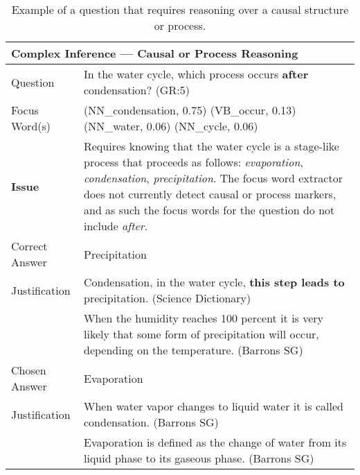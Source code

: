  
\begin{table}[]
\begin{footnotesize}
\begin{tabularx}{\textwidth}{p{2.5cm}p{10cm}}
\hline
\multicolumn{2}{l}{Complex Inference --- Causal or Process Reasoning} \\
\hline
Question & In the water cycle, which process occurs {\bf after} condensation? (GR:5)  \\
Focus Word(s) & (NN\_condensation, 0.75) (VB\_occur, 0.13) (NN\_water, 0.06) (NN\_cycle, 0.06)\\
\textbf{Issue}		& Requires knowing that the water cycle is a stage-like process that proceeds as follows: \emph{evaporation}, \emph{condensation}, \emph{precipitation}.  The focus word extractor does not currently detect causal or process markers, and as such the focus words for the question do not include \emph{after}. \\ 
\hline
Correct Answer &  Precipitation \\
Justification 	& Condensation, in the water cycle, {\bf this step leads to} precipitation. (Science Dictionary)\\
 				& When the humidity reaches 100 percent it is very likely that some form of precipitation will occur, depending on the temperature. (Barrons SG)\\
\hline
Chosen Answer & Evaporation\\
Justification 	& When water vapor changes to liquid water it is called condensation. (Barrons SG)\\
 	& Evaporation is defined as the change of water from its liquid phase to its gaseous phase. (Barrons SG)\\
\hline
\end{tabularx}
\end{footnotesize}
\caption{{  Example of a question that requires reasoning over a causal structure or process. }} 
\label{ex:structure}

\end{table}


 
